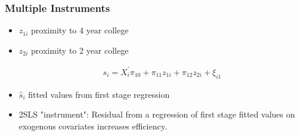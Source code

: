 \documentclass[pdftex]{beamer}
\begin{document}
 
 
\begin{frame}
\frametitle{Multiple Instruments}

\begin{itemize}
\item $z_{1i}$ proximity to 4 year college
\item $z_{2i}$ proximity to 2 year college

\[ \begin{array}{cl}
s_{i}= X_{i}^{'}\pi_{10}+\pi_{11}z_{1i}+\pi_{12}z_{2i}+\xi_{i1}
    \end{array}
\]

\item $\hat{s}_{i}$ fitted values from first stage regression

\item 2SLS "instrument": Residual from a regression of first stage fitted values on exogenous covariates increases efficiency.
\end{itemize}

\end{frame}
 
\end{document}
